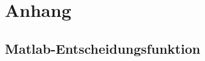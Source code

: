 \chapter{Anhang} \label{chap:Anhang}
\section{Matlab-Entscheidungsfunktion} \label{Anh:Entscheidungsfunktion}




